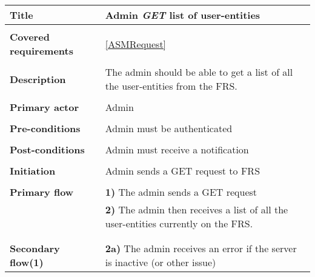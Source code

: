 \documentclass[a4paper,11pt]{article}
\begin{document}
\begin{tabular}{|p{3.5cm}|p{11.5cm}|} \hline
    \textbf{Title} &   Admin \emph{GET} list of user-entities
        
    \\ \hline \rowcolor{Gray} & \\ \hline
    
    \textbf{Covered requirements} &  \ref{ASMRequest}
        
    \\ \hline \rowcolor{Gray} & \\ \hline
        
    \textbf{Description} &  The admin should be able to get a list of all the user-entities from the FRS.
        
    \\ \hline \rowcolor{Gray} & \\ \hline
        
    \textbf{Primary actor} & Admin  
        
    \\ \hline \rowcolor{Gray} & \\ \hline 
          
    \textbf{Pre-conditions} &   Admin must be authenticated
        
    \\ \hline \rowcolor{Gray} & \\ \hline
         
    \textbf{Post-conditions} &   Admin must receive a notification
        
    \\ \hline \rowcolor{Gray} & \\ \hline 
         
    \textbf{Initiation} & Admin sends a GET request to FRS
        
    \\ \hline \rowcolor{Gray} & \\ \hline 
         
    \textbf{Primary flow} & 
    \textbf{1)} The admin sends a GET request \\&
    \textbf{2)} The admin then receives a list of all the user-entities currently on the FRS. \\&
        
    \\ \hline \rowcolor{Gray} & \\ \hline 
         
    \textbf{Secondary flow(1)} & 
    \textbf{2a)} The admin receives an error if the server is inactive (or other issue)
    
    \\ \hline 
\end{tabular}
\end{document}
